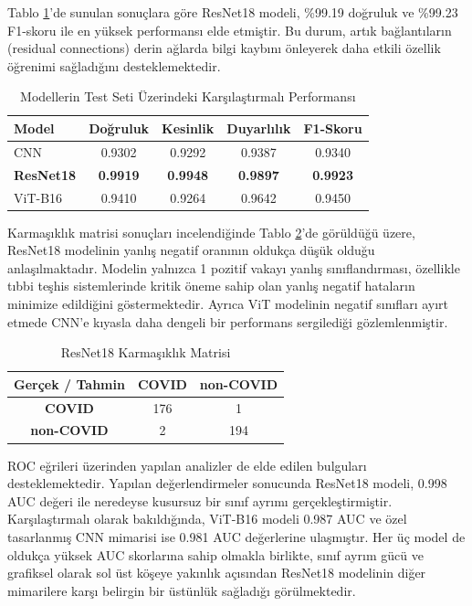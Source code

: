\documentclass[conference]{IEEEtran}
\begin{document}
Tablo \ref{tab:performans}'de sunulan sonuçlara göre ResNet18 modeli, \%99.19 doğruluk ve \%99.23 F1-skoru ile en yüksek performansı elde etmiştir. Bu durum, artık bağlantıların (residual connections) derin ağlarda bilgi kaybını önleyerek daha etkili özellik öğrenimi sağladığını desteklemektedir.

\begin{table}[htbp]
\caption{Modellerin Test Seti Üzerindeki Karşılaştırmalı Performansı}
\begin{center}
\begin{tabular}{|l|c|c|c|c|}
\hline
\textbf{Model} & \textbf{Doğruluk} & \textbf{Kesinlik} & \textbf{Duyarlılık} & \textbf{F1-Skoru} \\
\hline
CNN & 0.9302 & 0.9292 & 0.9387 & 0.9340 \\
\hline
\textbf{ResNet18} & \textbf{0.9919} & \textbf{0.9948} & \textbf{0.9897} & \textbf{0.9923} \\
\hline
ViT-B16 & 0.9410 & 0.9264 & 0.9642 & 0.9450 \\
\hline
\end{tabular}
\label{tab:performans}
\end{center}
\end{table}

Karmaşıklık matrisi sonuçları incelendiğinde Tablo \ref{tab:confusion_matrix}'de görüldüğü üzere, ResNet18 modelinin yanlış negatif oranının oldukça düşük olduğu anlaşılmaktadır. Modelin yalnızca 1 pozitif vakayı yanlış sınıflandırması, özellikle tıbbi teşhis sistemlerinde kritik öneme sahip olan yanlış negatif hataların minimize edildiğini göstermektedir. Ayrıca ViT modelinin negatif sınıfları ayırt etmede CNN'e kıyasla daha dengeli bir performans sergilediği gözlemlenmiştir.

\begin{table}[htbp]
\caption{ResNet18 Karmaşıklık Matrisi}
\label{tab:confusion_matrix}
\centering
\begin{tabular}{|c|c|c|}
\hline
\textbf{Gerçek / Tahmin} & \textbf{COVID} & \textbf{non-COVID} \\ \hline
\textbf{COVID} & 176 & 1 \\ \hline
\textbf{non-COVID} & 2 & 194 \\ \hline
\end{tabular}
\end{table}

ROC eğrileri üzerinden yapılan analizler de elde edilen bulguları desteklemektedir. Yapılan değerlendirmeler sonucunda ResNet18 modeli, 0.998 AUC değeri ile neredeyse kusursuz bir sınıf ayrımı gerçekleştirmiştir. Karşılaştırmalı olarak bakıldığında, ViT-B16 modeli 0.987 AUC ve özel tasarlanmış CNN mimarisi ise 0.981 AUC değerlerine ulaşmıştır. Her üç model de oldukça yüksek AUC skorlarına sahip olmakla birlikte, sınıf ayrım gücü ve grafiksel olarak sol üst köşeye yakınlık açısından ResNet18 modelinin diğer mimarilere karşı belirgin bir üstünlük sağladığı görülmektedir.
\end{document}
